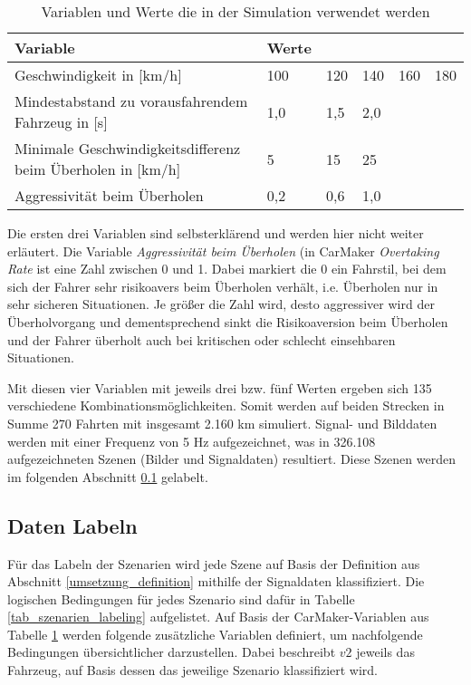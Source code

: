 \begin{table}[h]
\centering
\def\arraystretch{1.4}
\begin{tabular}{p{8cm} p{0.7cm} p{0.7cm} p{0.7cm} p{0.7cm} p{0.7cm}}
\textbf{Variable} & \textbf{Werte} & & & & \\
\hline
Geschwindigkeit in [km/h] & 100 & 120 & 140 & 160 & 180 \\
Mindestabstand zu vorausfahrendem Fahrzeug in [s] & 1,0 & 1,5 & 2,0 & & \\
Minimale Geschwindigkeitsdifferenz beim Überholen in [km/h] & 5 & 15 & 25 & & \\
Aggressivität beim Überholen & 0,2 & 0,6 & 1,0 & & \\
\hline
\end{tabular}
\caption{Variablen und Werte die in der Simulation verwendet werden}
\label{tab_tm_variablen}
\end{table}

Die ersten drei Variablen sind selbsterklärend und werden hier nicht weiter erläutert. Die Variable \textit{Aggressivität beim Überholen} (in CarMaker \textit{Overtaking Rate} ist eine Zahl zwischen 0 und 1. Dabei markiert die 0 ein Fahrstil, bei dem sich der Fahrer sehr risikoavers beim Überholen verhält, i.e. Überholen nur in sehr sicheren Situationen. Je größer die Zahl wird, desto aggressiver wird der Überholvorgang und dementsprechend sinkt die Risikoaversion beim Überholen und der Fahrer überholt auch bei kritischen oder schlecht einsehbaren Situationen.

Mit diesen vier Variablen mit jeweils drei bzw. fünf Werten ergeben sich 135 verschiedene Kombinationsmöglichkeiten. Somit werden auf beiden Strecken in Summe 270 Fahrten mit insgesamt 2.160 km simuliert. Signal- und Bilddaten werden mit einer Frequenz von 5 Hz aufgezeichnet, was in 326.108 aufgezeichneten Szenen (Bilder und Signaldaten) resultiert. Diese Szenen werden im folgenden Abschnitt \ref{umsetzung_daten_synth_labeling} gelabelt.


\subsection{Daten Labeln}
\label{umsetzung_daten_synth_labeling}

Für das Labeln der Szenarien wird jede Szene auf Basis der Definition aus Abschnitt \ref{umsetzung_definition} mithilfe der Signaldaten klassifiziert. Die logischen Bedingungen für jedes Szenario sind dafür in Tabelle \ref{tab_szenarien_labeling} aufgelistet. Auf Basis der CarMaker-Variablen aus Tabelle \ref{tab_tm_variablen} werden folgende zusätzliche Variablen definiert, um nachfolgende Bedingungen übersichtlicher darzustellen. Dabei beschreibt $v2$ jeweils das Fahrzeug, auf Basis dessen das jeweilige Szenario klassifiziert wird.


